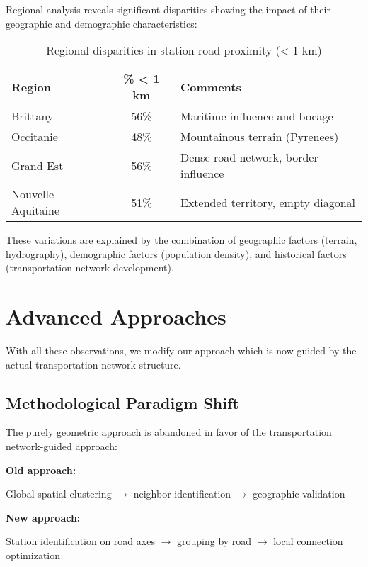 \documentclass[12pt,a4paper]{report}
\begin{document}
Regional analysis reveals significant disparities showing the impact of their geographic and demographic characteristics:

\begin{table}[h]
    \centering
    \begin{tabular}{l c p{8cm}}
        \hline
        \textbf{Region} & \textbf{\% < 1 km} & \textbf{Comments} \\
        \hline
        Brittany & 56\% & Maritime influence and bocage \\
        Occitanie & 48\% & Mountainous terrain (Pyrenees) \\
        Grand Est & 56\% & Dense road network, border influence \\
        Nouvelle-Aquitaine & 51\% & Extended territory, empty diagonal \\
        \hline
    \end{tabular}
    \caption{Regional disparities in station-road proximity (< 1 km)}
    \label{tab:disparites_regionales}
\end{table}

These variations are explained by the combination of geographic factors (terrain, hydrography), demographic factors (population density), and historical factors (transportation network development).

\section{Advanced Approaches}

With all these observations, we modify our approach which is now guided by the actual transportation network structure.

\subsection{Methodological Paradigm Shift}

The purely geometric approach is abandoned in favor of the transportation network-guided approach:

\textbf{Old approach:}
\begin{center}
Global spatial clustering $\rightarrow$ neighbor identification $\rightarrow$ geographic validation
\end{center}

\textbf{New approach:}
\begin{center}
Station identification on road axes $\rightarrow$ grouping by road $\rightarrow$ local connection optimization
\end{center}
\end{document}
